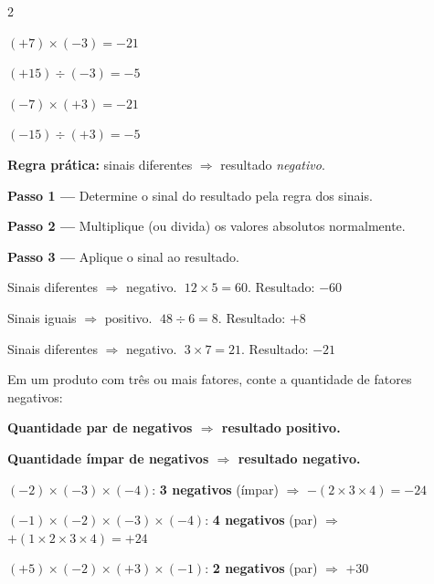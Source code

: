 \documentclass[12pt,twoside]{article}
\begin{document}
\begin{multicols}{2}
\Formula{(+)\times(-)=(-) \qquad (-)\times(+)=(-)}
\Formula{(+)\div(-)=(-) \qquad (-)\div(+)=(-)}


$(+7)\times(-3) = -21$

$(+15)\div(-3) = -5$

$(-7)\times(+3) = -21$

$(-15)\div(+3) = -5$

\vspace{4pt}
\textbf{Regra prática:} sinais diferentes $\Rightarrow$ resultado \emph{negativo}.


\textbf{Passo 1 —} Determine o sinal do resultado pela regra dos sinais.

\textbf{Passo 2 —} Multiplique (ou divida) os valores absolutos normalmente.

\textbf{Passo 3 —} Aplique o sinal ao resultado.


Sinais diferentes $\Rightarrow$ negativo. $\;12\times5=60$. \quad Resultado: $-60$ \checkmark


Sinais iguais $\Rightarrow$ positivo. $\;48\div6=8$. \quad Resultado: $+8$ \checkmark


Sinais diferentes $\Rightarrow$ negativo. $\;3\times7=21$. \quad Resultado: $-21$ \checkmark


Em um produto com três ou mais fatores, conte a quantidade de fatores negativos:

\textbf{Quantidade par de negativos $\Rightarrow$ resultado positivo.}

\textbf{Quantidade ímpar de negativos $\Rightarrow$ resultado negativo.}


$(-2)\times(-3)\times(-4)$: \textbf{3 negativos} (ímpar) $\Rightarrow$ $-(2\times3\times4) = -24$ \checkmark

$(-1)\times(-2)\times(-3)\times(-4)$: \textbf{4 negativos} (par) $\Rightarrow$ $+(1\times2\times3\times4) = +24$ \checkmark

$(+5)\times(-2)\times(+3)\times(-1)$: \textbf{2 negativos} (par) $\Rightarrow$ $+30$ \checkmark



\end{multicols}
\end{document}
